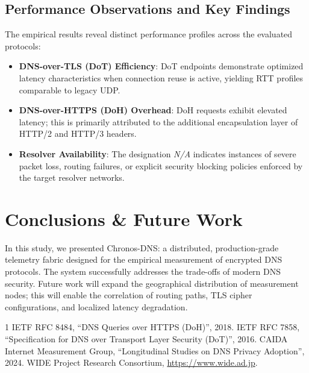 \documentclass[10pt,journal,compsoc]{IEEEtran}
\begin{document}
\subsection{Performance Observations and Key Findings}
The empirical results reveal distinct performance profiles across the evaluated protocols:
\begin{itemize}
    \item \textbf{DNS-over-TLS (DoT) Efficiency}: DoT endpoints demonstrate optimized latency characteristics when connection reuse is active, yielding RTT profiles comparable to legacy UDP.
    \item \textbf{DNS-over-HTTPS (DoH) Overhead}: DoH requests exhibit elevated latency; this is primarily attributed to the additional encapsulation layer of HTTP/2 and HTTP/3 headers.
    \item \textbf{Resolver Availability}: The designation \textit{N/A} indicates instances of severe packet loss, routing failures, or explicit security blocking policies enforced by the target resolver networks.
\end{itemize}

\section{Conclusions \& Future Work}
In this study, we presented Chronos-DNS: a distributed, production-grade telemetry fabric designed for the empirical measurement of encrypted DNS protocols. The system successfully addresses the trade-offs of modern DNS security. Future work will expand the geographical distribution of measurement nodes; this will enable the correlation of routing paths, TLS cipher configurations, and localized latency degradation.

\vfill
\newpage
\vspace*{80pt} %
\begin{thebibliography}{1}
IETF RFC 8484, ``DNS Queries over HTTPS (DoH)'', 2018.
IETF RFC 7858, ``Specification for DNS over Transport Layer Security (DoT)'', 2016.
CAIDA Internet Measurement Group, ``Longitudinal Studies on DNS Privacy Adoption'', 2024.
WIDE Project Research Consortium, \url{https://www.wide.ad.jp}.
\end{thebibliography}
\end{document}

